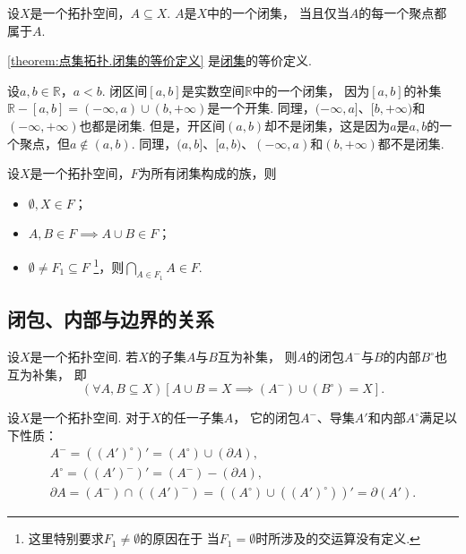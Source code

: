\begin{theorem}\label{theorem:点集拓扑.闭集的等价定义}
设\(X\)是一个拓扑空间，\(A \subseteq X\).
\(A\)是\(X\)中的一个闭集，
当且仅当\(A\)的每一个聚点都属于\(A\).
\end{theorem}
\cref{theorem:点集拓扑.闭集的等价定义} 是\hyperref[definition:拓扑空间.闭集的定义]{闭集}的等价定义.

\begin{example}
设\(a,b\in\mathbb{R}\)，\(a<b\).
闭区间\([a,b]\)是实数空间\(\mathbb{R}\)中的一个闭集，
因为\([a,b]\)的补集\(\mathbb{R}-[a,b]
=(-\infty,a)\cup(b,+\infty)\)是一个开集.
同理，\((-\infty,a]\)、\([b,+\infty)\)和\((-\infty,+\infty)\)也都是闭集.
但是，开区间\((a,b)\)却不是闭集，这是因为\(a\)是\(a,b\)的一个聚点，但\(a\notin(a,b)\).
同理，\((a,b]\)、\([a,b)\)、\((-\infty,a)\)和\((b,+\infty)\)都不是闭集.
\end{example}

\begin{theorem}\label{theorem:拓扑学.闭集族的性质}
设\(X\)是一个拓扑空间，\(F\)为所有闭集构成的族，则
\begin{itemize}
	\item \(\emptyset,X \in F\)；
	\item \(A,B \in F \implies A \cup B \in F\)；
	\item \(\emptyset \neq F_1 \subseteq F\)
	\footnote{%
		这里特别要求\(F_1 \neq \emptyset\)的原因在于
		当\(F_1 = \emptyset\)时所涉及的交运算没有定义.
	}，则\(\bigcap_{A \in F_1} A \in F\).
\end{itemize}
\end{theorem}

\subsection{闭包、内部与边界的关系}
\begin{theorem}\label{theorem:拓扑学.内部与闭包的联系}
设\(X\)是一个拓扑空间.
若\(X\)的子集\(A\)与\(B\)互为补集，
则\(A\)的闭包\(A^-\)与\(B\)的内部\(B^\circ\)也互为补集，
即\[
	(\forall A,B \subseteq X)[A \cup B = X \implies (A^-) \cup (B^\circ) = X].
\]
\end{theorem}

\begin{theorem}
设\(X\)是一个拓扑空间.
对于\(X\)的任一子集\(A\)，
它的闭包\(A^-\)、导集\(A'\)和内部\(A^\circ\)满足以下性质：\begin{gather*}
	A^-
	= ((A')^\circ)'
	= (A^\circ) \cup (\partial A), \\
	A^\circ
	= ((A')^-)'
	= (A^-) - (\partial A), \\
	\partial A
	= (A^-) \cap ((A')^-)
	= ((A^\circ) \cup ((A')^\circ))'
	= \partial(A').
\end{gather*}
\end{theorem}

